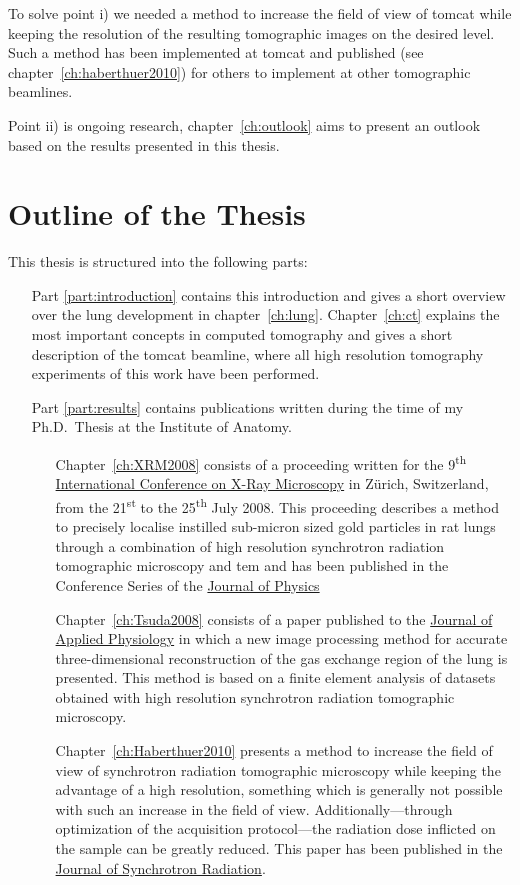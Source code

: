 To solve point i) we needed a method to increase the field of view of \ac{tomcat} while keeping the resolution of the resulting tomographic images on the desired level. Such a method has been implemented at \ac{tomcat} and published (see chapter~\ref{ch:haberthuer2010}) for others to implement at other tomographic beamlines.

Point ii) is ongoing research, chapter~\ref{ch:outlook} aims to present an outlook based on the results presented in this thesis. 

\section{Outline of the Thesis}
This thesis is structured into the following parts:
\begin{itemize}
	\item [Part \ref{part:introduction}] contains this introduction and gives a short overview over the lung development in chapter~\ref{ch:lung}. Chapter~\ref{ch:ct} explains the most important concepts in computed tomography and gives a short description of the \acf{tomcat} beamline, where all high resolution tomography experiments of this work have been performed.
	\item [Part \ref{part:results}] contains publications written during the time of my Ph.D.\ Thesis at the Institute of Anatomy.
	\begin{itemize}
		\item [Chapter~\ref{ch:XRM2008}] consists of a proceeding written for the 9\textsuperscript{th} \href{http://xrm2008.web.psi.ch/}{International Conference on X-Ray Microscopy} in Zürich, Switzerland, from the 21\textsuperscript{st} to the 25\textsuperscript{th} July 2008. This proceeding describes a method to precisely localise instilled sub-micron sized gold particles in rat lungs through a combination of high resolution synchrotron radiation tomographic microscopy and \acl{tem} and has been published in the Conference Series of the \href{http://iopscience.iop.org/1742-6596/}{Journal of Physics}
		\item [Chapter~\ref{ch:Tsuda2008}] consists of a paper published to the \href{http://jap.physiology.org/}{Journal of Applied Physiology} in which a new image processing method for accurate three-dimensional reconstruction of the gas exchange region of the lung is presented. This method is based on a finite element analysis of datasets obtained with high resolution synchrotron radiation tomographic microscopy.
		\item [Chapter~\ref{ch:Haberthuer2010}] presents a method to increase the field of view of synchrotron radiation tomographic microscopy while keeping the advantage of a high resolution, something which is generally not possible with such an increase in the field of view. Additionally---through optimization of the acquisition protocol---the radiation dose inflicted on the sample can be greatly reduced. This paper has been published in the \href{http://journals.iucr.org/s/}{Journal of Synchrotron Radiation}.

\end{itemize}
\end{itemize}
